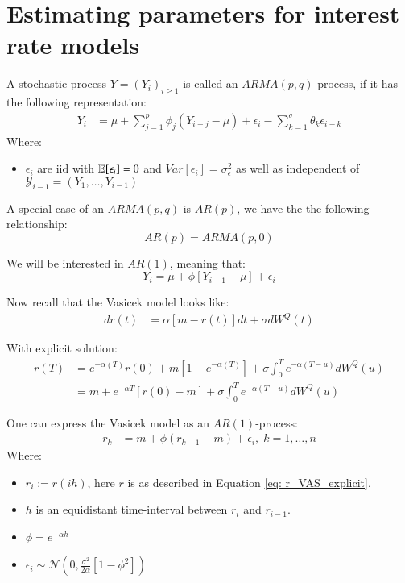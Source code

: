 \chapter{Estimating parameters for interest rate models} 

\begin{definition}
A stochastic process $Y = (Y_{i})_{i\geq 1}$ is called an $ARMA(p,q)$ process, if it has the following representation: 
\begin{align*}
Y_{i} &= \mu + \sum_{j=1}^{p}\phi_{j}(Y_{i-j}-\mu) + \epsilon_{i} - \sum_{k=1}^{q}\theta_{k}\epsilon_{i-k} \end{align*}
Where: 
\begin{itemize}[leftmargin =*]
    \item $\epsilon_{i}$ are iid with $\mathbb{E}[\epsilon_{i}] = 0$ and $Var[\epsilon_{i}] = \sigma_{\epsilon}^{2}$ as well as independent of \\ 
    $\mathcal{Y}_{i-1} = (Y_{1}, \dots, Y_{i-1})$
\end{itemize}
\end{definition}


A special case of an $ARMA(p,q)$ is $AR(p)$, we have the the following relationship: 
\[
AR(p) = ARMA(p,0)
\]

We will be interested in $AR(1)$, meaning that: 
\[
Y_{i} = \mu + \phi[Y_{i-1}-\mu] + \epsilon_{i}
\]


Now recall that the Vasicek model looks like:
\begin{align*}
dr(t) &= \alpha[m - r(t)]dt + \sigma dW^{Q}(t)    
\end{align*}

With explicit solution:
\begin{align}
\label{eq: r_VAS_explicit}
r(T) &= e^{-\alpha(T)}r(0) + m[1-e^{-\alpha(T)}] 
+ \sigma \int_{0}^{T}e^{-\alpha(T-u)}dW^{Q}(u) \nonumber \\ 
&= 
m + e^{-\alpha T}\left[r(0) -m \right]
+ \sigma \int_{0}^{T}e^{-\alpha(T-u)}dW^{Q}(u)
\end{align} 


\begin{proposition}
One can express the Vasicek model as an $AR(1)$-process: 
\begin{align*}
r_{k} &= m + \phi (r_{k-1}-m) + \epsilon_{i}, \; k = 1, \dots, n     
\end{align*}
Where:
\begin{itemize}[leftmargin =*]
    \item $r_{i} := r(ih)$, here $r$ is as described in Equation \ref{eq: r_VAS_explicit}. 
    \item $h$ is an equidistant time-interval between $r_{i}$ and $r_{i-1}$. 
    \item $\phi = e^{-\alpha h}$
    \item $\epsilon_{i} \sim \mathcal{N}\left(
    0, \frac{\sigma^{2}}{2\alpha}\left[
    1-\phi^{2}
    \right]\right)$
\end{itemize}
\end{proposition}

